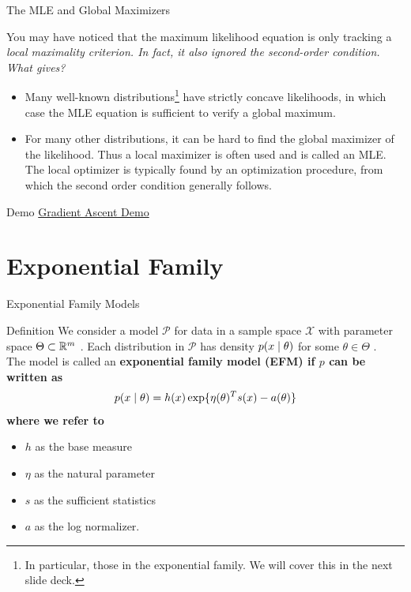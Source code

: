 \documentclass[10pt]{beamer}
\begin{document}
\begin{frame}{The MLE and Global Maximizers}

You may have noticed that the maximum likelihood equation is only tracking a \it{local} maximality criterion.  In fact, it also ignored the second-order condition. What gives?

\begin{itemize}
\item Many well-known distributions\footnote{In particular, those in the exponential family.  We will cover this in the next slide deck.} have strictly concave likelihoods, in which case the MLE equation is sufficient to verify a global maximum. 
\item For many other distributions, it can be hard to find the global maximizer of the likelihood. Thus a local maximizer is often used and is called an MLE.   The local optimizer is typically found by an optimization procedure, from which the second order condition generally follows.
\end{itemize}

\end{frame}

\begin{frame}{Demo}
\href{https://colab.research.google.com/drive/1PokSTCC1u0QWghxLVWhS30ycVRWjNMbG}{Gradient Ascent Demo}
\end{frame}

\section{Exponential Family}


\begin{frame}{Exponential Family Models}

\begin{sblock}{Definition}
We consider a model $\mathcal{P}$ for data in a sample space $\mathcal{X}$ with parameter space $\Theta \subset \mathbb{R}^m$ . Each distribution in $\mathcal{P}$ has density $p(x \; | \; \theta)$ for some $\theta \in \Theta$ . \\
\vfill
The model is called an \bf{exponential family model} (EFM) if $p$ can be written as
\begin{align*}
 p(x \; | \; \theta) = h(x) \exp \{ \eta(\theta)^T s(x) - a(\theta)\} 
 \end{align*}
where we refer to 
\begin{itemize}
\item $h$ as the base measure
\item  $\eta$ as the natural parameter
\item $s$ as the sufficient statistics
\item $a$ as the log normalizer. 
\end{itemize}
\end{sblock}
\end{frame}
\end{document}
